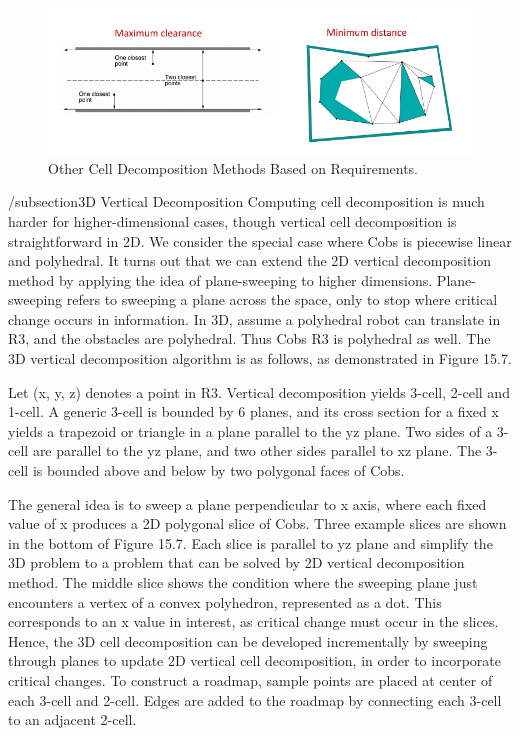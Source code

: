 \documentclass[twoside]{article}
\begin{document}
\begin{figure}[h]
\begin{center}
\includegraphics{fig15_6.PNG}
\caption{Other Cell Decomposition Methods Based on Requirements.}
\end{center}
\end{figure}

/subsection{3D Vertical Decomposition}
Computing cell decomposition is much harder for higher-dimensional cases, though vertical cell decomposition is straightforward in 2D. We consider the special case where Cobs is piecewise linear and polyhedral.
It turns out that we can extend the 2D vertical decomposition method by applying the idea of plane-sweeping to higher dimensions. Plane-sweeping refers to sweeping a plane across the space, only to stop where critical change occurs in information. In 3D, assume a polyhedral robot can translate in R3, and the obstacles are polyhedral. Thus Cobs R3 is polyhedral as well. The 3D vertical decomposition algorithm is as follows, as demonstrated in Figure 15.7.

Let (x, y, z) denotes a point in R3. Vertical decomposition yields 3-cell, 2-cell and 1-cell. A generic 3-cell is bounded by 6 planes, and its cross section for a fixed x yields a trapezoid or triangle in a plane parallel to the yz plane. Two sides of a 3-cell are parallel to the yz plane, and two other sides parallel to xz plane. The 3-cell is bounded above and below by two polygonal faces of Cobs.

The general idea is to sweep a plane perpendicular to x axis, where each fixed value of x produces a 2D polygonal slice of Cobs. Three example slices are shown in the bottom of Figure 15.7. Each slice is parallel to yz plane and simplify the 3D problem to a problem that can be solved by 2D vertical decomposition method. The middle slice shows the condition where the sweeping plane just encounters a vertex of a convex polyhedron, represented as a dot. This corresponds to an x value in interest, as critical change
must occur in the slices. Hence, the 3D cell decomposition can be developed incrementally by sweeping through planes to update 2D vertical cell decomposition, in order to incorporate critical changes. To construct a roadmap, sample points are placed at center of each 3-cell and 2-cell. Edges are added to the roadmap by connecting each 3-cell to an adjacent 2-cell.
\end{document}
